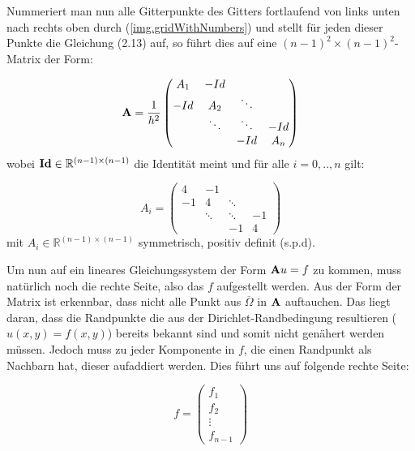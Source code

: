 
Nummeriert man nun alle Gitterpunkte des Gitters fortlaufend von links unten nach rechts oben durch (\autoref{img.gridWithNumbers}) und stellt für jeden dieser Punkte die Gleichung (2.13) auf, so führt dies auf eine $(n-1)^{2} \times (n-1)^{2}$-Matrix der Form:

\begin{equation}
{\textbf{A}} = \frac {1} {h^{2}}
\begin{pmatrix}
A_{1} & -Id \\
-Id & A_{2} & \ddots \\
 & \ddots & \ddots & -Id \\
 & & -Id & A_{n}
\end{pmatrix}\label{eq.PoissonMatrix}
\end{equation}
wobei ${\textbf{Id}} \in \mathbb{R}^{(n-1) \times (n-1)}$ die Identität meint und für alle $i = 0,..,n$ gilt:

\begin{equation}
A_{i} = 
\begin{pmatrix}
4 & -1 & & \\
-1 & 4 & \ddots & \\
 & \ddots & \ddots & -1 \\
 & & -1 & 4
\end{pmatrix}
\end{equation}
mit $A_{i} \in \mathbb{R}^{(n-1) \times (n-1)}$ symmetrisch, positiv definit (s.p.d).

Um nun auf ein lineares Gleichungssystem der Form ${\textbf{A}}u = f$ zu kommen, muss natürlich noch die rechte Seite, also das $f$ aufgestellt werden. Aus der Form der Matrix ist erkennbar, dass nicht alle Punkt aus $\overline \Omega$ in ${\textbf{A}}$ auftauchen. Das liegt daran, dass die Randpunkte die aus der Dirichlet-Randbedingung resultieren ($u(x,y) = f(x,y)$) bereits bekannt sind und somit nicht genähert werden müssen. Jedoch muss zu jeder Komponente in $f$, die einen Randpunkt als Nachbarn hat, dieser aufaddiert werden. Dies führt uns auf folgende rechte Seite:

\begin{equation}
f = 
\begin{pmatrix}
f_{1} \\ f_{2} \\ \vdots \\ f_{n-1}
\end{pmatrix}
\end{equation}

